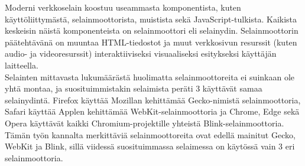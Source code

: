 \documentclass[finnish, 12pt, a4paper, elec, utf8, a-1b, online]{aaltothesis}
\begin{document}
\begin{table}[htb]
  \caption{Selainten markkinaosuus tietokonekäytössä helmikuussa 2022. \cite{StatCounter}\cite{Similiarweb} \label{taulukko1}}
  \centering
\end{table}

\noindent Moderni verkkoselain koostuu useammasta komponentista, kuten käyttöliittymästä, selainmoottorista, muistista sekä JavaScript-tulkista. Kaikista keskeisin näistä komponenteista on selainmoottori eli selainydin. Selainmoottorin päätehtävänä on muuntaa HTML-tiedostot ja muut verkkosivun resurssit (kuten audio- ja videoresurssit) interaktiiviseksi visuaaliseksi esitykseksi käyttäjän laitteella. \\

\noindent Selainten mittavasta lukumäärästä huolimatta selainmoottoreita ei suinkaan ole yhtä montaa, ja suosituimmistakin selaimista peräti 3 käyttävät samaa selainydintä. Firefox käyttää Mozillan kehittämää Gecko-nimistä selainmoottoria, Safari käyttää Applen kehittämää WebKit-selainmoottoria ja Chrome, Edge sekä Opera käyttävät kaikki Chromium-projektille yhteistä Blink-selainmoottoria. \cite{Nield} Tämän työn kannalta merkittäviä selainmoottoreita ovat edellä mainitut Gecko, WebKit ja Blink, sillä viidessä suosituimmassa selaimessa on käytössä vain 3 eri selainmoottoria.
\end{document}
